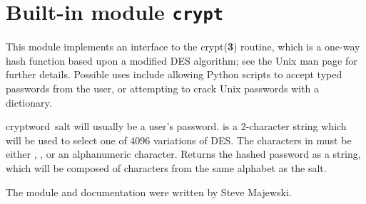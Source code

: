 \section{Built-in module {\tt crypt}}

This module implements an interface to the crypt({\bf 3}) routine,
which is a one-way hash function based upon a modified DES algorithm;
see the Unix man page for further details.  Possible uses include
allowing Python scripts to accept typed passwords from the user, or
attempting to crack Unix passwords with a dictionary.

\begin{funcdesc}{crypt}{word\, salt} 
 will usually be a user's password.   is a
2-character string which will be used to select one of 4096 variations
of DES.  The characters in  must be either ,
\code{/}, or an alphanumeric character.  Returns the hashed password
as a string, which will be composed of characters from the same
alphabet as the salt.
\end{funcdesc}

The module and documentation were written by Steve Majewski.
